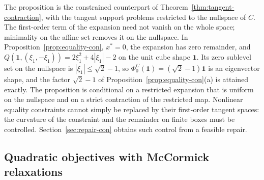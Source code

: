 The proposition is the constrained counterpart of
Theorem~\ref{thm:tangent-contraction}, with the tangent support problems
restricted to the nullspace of $C$. The first-order term of the expansion
need not vanish on the whole space; minimality on the affine set removes
it on the nullspace. In Proposition~\ref{prop:equality-con}, $x^*=0$, the expansion has zero
remainder, and $Q(\mathbf 1,(\xi_1,-\xi_1))=2\xi_1^2+4|\xi_1|-2$ on the
unit cube shape $\mathbf 1$. Its zero sublevel set on the nullspace is
$|\xi_1|\le\sqrt2-1$, so $\Phi^C_0(\mathbf 1)=(\sqrt2-1)\mathbf 1$ is an
eigenvector shape, and the factor $\sqrt2-1$ of
Proposition~\ref{prop:equality-con}(a) is attained exactly. The
proposition is conditional on a restricted expansion that is uniform on
the nullspace and on a strict contraction of the restricted map. Nonlinear
equality constraints cannot simply be replaced by their first-order
tangent spaces: the curvature of the constraint and the remainder on
finite boxes must be controlled. Section~\ref{sec:repair-con} obtains such control from a feasible repair.

\subsection{Quadratic objectives with McCormick relaxations}\label{sec:local-rates-quadratic}

